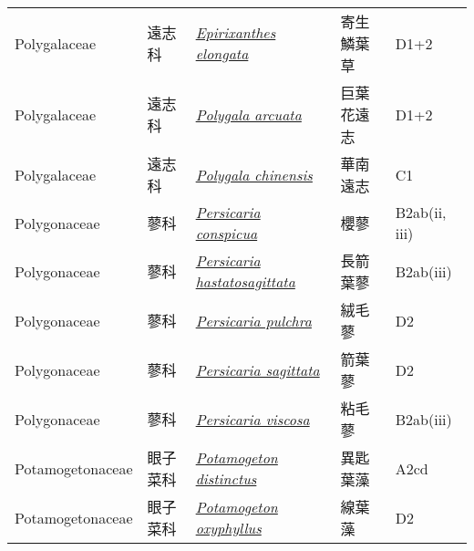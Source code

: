 {\begin{longtable}{p{2.5cm}p{2.5cm}p{4.5cm}p{2.5cm}p{3cm}}
    Polygalaceae & 遠志科 & \href{http://www.theplantlist.org/tpl1.1/search?q=Epirixanthes+elongata}{\textit{Epirixanthes elongata} } & 寄生鱗葉草 & D1+2 \index{Epirixanthes@\textit{Epirixanthes}!elongata@\textit{elongata}}  \index{寄生鱗葉草} \\
    Polygalaceae & 遠志科 & \href{http://www.theplantlist.org/tpl1.1/search?q=Polygala+arcuata}{\textit{Polygala arcuata} } & 巨葉花遠志 & D1+2 \index{Polygala@\textit{Polygala}!arcuata@\textit{arcuata}}  \index{巨葉花遠志} \\
    Polygalaceae & 遠志科 & \href{http://www.theplantlist.org/tpl1.1/search?q=Polygala+chinensis}{\textit{Polygala chinensis} } & 華南遠志 & C1 \index{Polygala@\textit{Polygala}!chinensis@\textit{chinensis}}  \index{華南遠志} \\
    Polygonaceae & 蓼科 & \href{http://www.theplantlist.org/tpl1.1/search?q=Persicaria+conspicua}{\textit{Persicaria conspicua} } & 櫻蓼 & B2ab(ii, iii) \index{Persicaria@\textit{Persicaria}!conspicua@\textit{conspicua}}  \index{櫻蓼} \\
    Polygonaceae & 蓼科 & \href{http://www.theplantlist.org/tpl1.1/search?q=Persicaria+hastatosagittata}{\textit{Persicaria hastatosagittata} } & 長箭葉蓼 & B2ab(iii) \index{Persicaria@\textit{Persicaria}!hastatosagittata@\textit{hastatosagittata}}  \index{長箭葉蓼} \\
    Polygonaceae & 蓼科 & \href{http://www.theplantlist.org/tpl1.1/search?q=Persicaria+pulchra}{\textit{Persicaria pulchra} } & 絨毛蓼 & D2 \index{Persicaria@\textit{Persicaria}!pulchra@\textit{pulchra}}  \index{絨毛蓼} \\
    Polygonaceae & 蓼科 & \href{http://www.theplantlist.org/tpl1.1/search?q=Persicaria+sagittata}{\textit{Persicaria sagittata} } & 箭葉蓼 & D2 \index{Persicaria@\textit{Persicaria}!sagittata@\textit{sagittata}}  \index{箭葉蓼} \\
    Polygonaceae & 蓼科 & \href{http://www.theplantlist.org/tpl1.1/search?q=Persicaria+viscosa}{\textit{Persicaria viscosa} } & 粘毛蓼 & B2ab(iii) \index{Persicaria@\textit{Persicaria}!viscosa@\textit{viscosa}}  \index{粘毛蓼} \\
    Potamogetonaceae & 眼子菜科 & \href{http://www.theplantlist.org/tpl1.1/search?q=Potamogeton+distinctus}{\textit{Potamogeton distinctus} } & 異匙葉藻 & A2cd \index{Potamogeton@\textit{Potamogeton}!distinctus@\textit{distinctus}}  \index{異匙葉藻} \\
    Potamogetonaceae & 眼子菜科 & \href{http://www.theplantlist.org/tpl1.1/search?q=Potamogeton+oxyphyllus}{\textit{Potamogeton oxyphyllus} } & 線葉藻 & D2 \index{Potamogeton@\textit{Potamogeton}!oxyphyllus@\textit{oxyphyllus}}  \index{線葉藻} \\

\end{longtable}}

